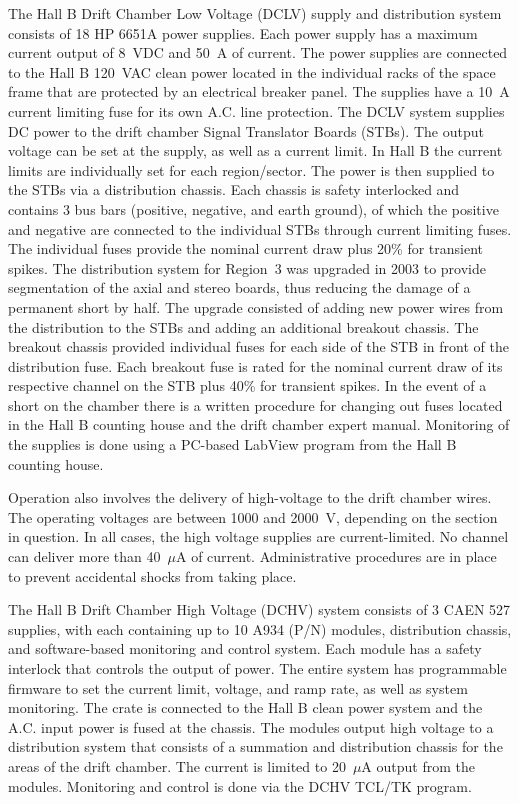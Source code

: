 The Hall B Drift Chamber Low Voltage (DCLV) supply and distribution system 
consists of 18 HP 6651A power supplies. Each power supply has a maximum 
current output of 8~VDC and 50~A of current. The power supplies are connected 
to the Hall B 120~VAC clean power located in the individual racks of the 
space frame that are protected by an electrical breaker panel. The supplies 
have a 10~A current limiting fuse for its own A.C. line protection.  The 
DCLV system supplies DC power to the drift chamber Signal Translator Boards 
(STBs). The output voltage can be set at the supply, as well as a current 
limit. In Hall B the current limits are individually set for each 
region/sector. The power is then supplied to the STBs via a distribution 
chassis.  Each chassis is safety interlocked and contains 3 bus bars 
(positive, negative, and earth ground), of which the positive and negative 
are connected to the individual STBs through current limiting fuses.  The 
individual fuses provide the nominal current draw plus 20\% for transient 
spikes. The distribution system for Region~3 was upgraded in 2003 to provide 
segmentation of the axial and stereo boards, thus reducing the damage of a 
permanent short by half. The upgrade consisted of adding new power wires 
from the distribution to the STBs and adding an additional breakout chassis. 
The breakout chassis provided individual fuses for each side of the STB in 
front of the distribution fuse.  Each breakout fuse is rated for the nominal 
current draw of its respective channel on the STB plus 40\% for transient 
spikes.  In the event of a short on the chamber there is a written procedure 
for changing out fuses located in the Hall B counting house and the drift 
chamber expert manual.  Monitoring of the supplies is done using a PC-based 
LabView program from the Hall B counting house.

Operation also involves the delivery of high-voltage to the drift chamber 
wires.  The operating voltages are between 1000 and 2000~V, depending on 
the section in question.  In all cases, the high voltage supplies are 
current-limited.  No channel can deliver more than 40~$\mu$A of current.  
Administrative procedures are in place to prevent accidental shocks from 
taking place.

The Hall B Drift Chamber High Voltage (DCHV) system consists of 3 CAEN 527 
supplies, with each containing up to 10 A934 (P/N) modules, distribution 
chassis, and software-based monitoring and control system.  Each module has 
a safety interlock that controls the output of power. The entire system has 
programmable firmware to set the current limit, voltage, and ramp rate, as 
well as system monitoring. The crate is connected to the Hall B clean power 
system and the A.C. input power is fused at the chassis. The modules output 
high voltage to a distribution system that consists of a summation and 
distribution chassis for the areas of the drift chamber. The current is 
limited to 20~$\mu$A output from the modules.  Monitoring and control is 
done via the DCHV TCL/TK program.

